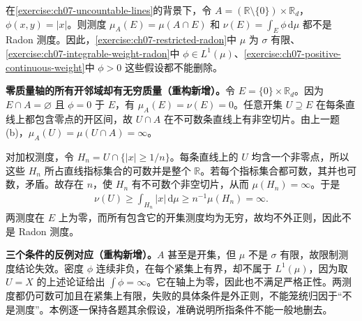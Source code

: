 \documentclass[../../main.tex]{subfiles}
\begin{document}
\begin{exercise}\label{exercise:ch07-zero-weight-failure}
在\cref{exercise:ch07-uncountable-lines}的背景下，令 $A=(\mathbb R\setminus\{0\})\times\mathbb R_d$，$\phi(x,y)=|x|$。则测度 $\mu_A(E)=\mu(A\cap E)$ 和 $\nu(E)=\int_E\phi\,\mathrm d\mu$ 都不是 Radon 测度。因此，\cref{exercise:ch07-restricted-radon}中 $\mu$ 为 $\sigma$ 有限、\cref{exercise:ch07-integrable-weight-radon}中 $\phi\in L^1(\mu)$、\cref{exercise:ch07-positive-continuous-weight}中 $\phi>0$ 这些假设都不能删除。
\end{exercise}
\begin{solution}
\textbf{零质量轴的所有开邻域却有无穷质量（重构新增）。}令 $E=\{0\}\times\mathbb R_d$。因为 $E\cap A=\varnothing$ 且 $\phi=0$ 于 $E$，有 $\mu_A(E)=\nu(E)=0$。任意开集 $U\supseteq E$ 在每条直线上都包含零点的开区间，故 $U\cap A$ 在不可数条直线上有非空切片。由上一题 (b)，$\mu_A(U)=\mu(U\cap A)=\infty$。

对加权测度，令 $H_n=U\cap\{|x|\geqslant1/n\}$。每条直线上的 $U$ 均含一个非零点，所以这些 $H_n$ 所占直线指标集合的可数并是整个 $\mathbb R$。若每个指标集合都可数，其并也可数，矛盾。故存在 $n$，使 $H_n$ 有不可数个非空切片，从而 $\mu(H_n)=\infty$。于是
\begin{align*}
\nu(U)\geqslant\int_{H_n}|x|\,\mathrm d\mu\geqslant n^{-1}\mu(H_n)=\infty.
\end{align*}
两测度在 $E$ 上为零，而所有包含它的开集测度均为无穷，故均不外正则，因此不是 Radon 测度。
\end{solution}
\begin{remark}
\textbf{三个条件的反例对应（重构新增）。}$A$ 甚至是开集，但 $\mu$ 不是 $\sigma$ 有限，故限制测度结论失效。密度 $\phi$ 连续非负，在每个紧集上有界，却不属于 $L^1(\mu)$，因为取 $U=X$ 的上述论证给出 $\int\phi=\infty$。它在轴上为零，因此也不满足严格正性。两测度都仍可数可加且在紧集上有限，失败的具体条件是外正则，不能笼统归因于“不是测度”。本例逐一保持各题其余假设，准确说明所指条件不能一般地删去。
\end{remark}
\end{document}
